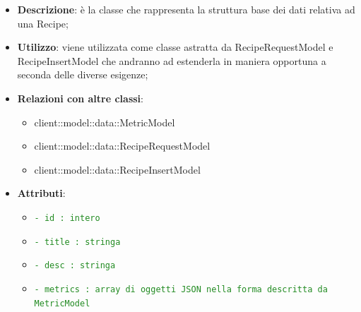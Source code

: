 			\begin{itemize}
				\item \textbf{Descrizione}: è la classe che rappresenta la struttura base dei dati relativa ad una Recipe;
				\item \textbf{Utilizzo}: viene utilizzata come classe astratta da RecipeRequestModel e RecipeInsertModel che andranno ad estenderla in maniera opportuna a seconda delle diverse esigenze;
				\item \textbf{Relazioni con altre classi}:
					\begin{itemize}
						\item client::model::data::MetricModel
						\item client::model::data::RecipeRequestModel
						\item client::model::data::RecipeInsertModel
					\end{itemize}
				\item \textbf{Attributi}:
					\begin{itemize}
						\item \textcolor{forestgreen}{\texttt{- id : intero}}
						\item \textcolor{forestgreen}{\texttt{- title : stringa}}
						\item \textcolor{forestgreen}{\texttt{- desc : stringa}}
						\item \textcolor{forestgreen}{\texttt{- metrics : array di oggetti JSON nella forma descritta da MetricModel}}
					\end{itemize}
			\end{itemize}

